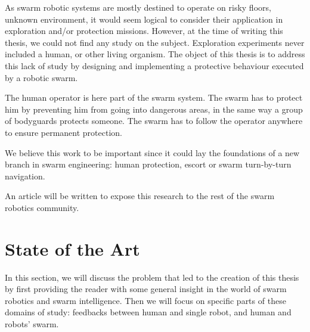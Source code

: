 \documentclass[oneside, a4paper, 12pt]{memoir}
\begin{document}

As swarm robotic systems are mostly destined to operate on risky floors, unknown environment, it would seem logical to consider their application in exploration and/or protection missions. However, at the time of writing this thesis, we could not find any study on the subject. Exploration experiments never included a human, or other living organism. The object of this thesis is to address this lack of study by designing and implementing a protective behaviour executed by a robotic swarm.
	
	The human operator is here part of the swarm system. The swarm has to protect him by preventing him from going into dangerous areas, in the same way a group of bodyguards protects someone. The swarm has to follow the operator anywhere to ensure permanent protection.
	
	We believe this work to be important since it could lay the foundations of a new branch in swarm engineering: human protection, escort or swarm turn-by-turn navigation.
	
	An article will be written to expose this research to the rest of the swarm robotics community.

\chapter{State of the Art}
	\label{chap:state_of_the_art}
	In this section, we will discuss the problem that led to the creation of this thesis by first providing the reader with some general insight in the world of swarm robotics and swarm intelligence. Then we will focus on specific parts of these domains of study: feedbacks between human and single robot, and human and robots' swarm.
	
\end{document}

